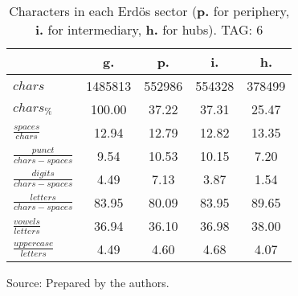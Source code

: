 \begin{table}[h!]
\begin{center}
\caption{Characters in each Erd\"os sector ({{\bf p.}} for periphery, {{\bf i.}} for intermediary, 
	{{\bf h.}} for hubs). TAG: 6}\label{tab:cha}
\begin{tabular}{| l || c | c | c | c |}\hline
 & {\bf g.} & {\bf p.} & {\bf i.} & {\bf h.} \\\hline\hline
$chars$ & 1485813  & 552986  & 554328  & 378499 \\
$chars_{\%}$ & 100.00  & 37.22  & 37.31  & 25.47 \\\hline
$\frac{spaces}{chars}$ & 12.94  & 12.79  & 12.82  & 13.35 \\
$\frac{punct}{chars-spaces}$ & 9.54  & 10.53  & 10.15  & 7.20 \\
$\frac{digits}{chars-spaces}$ & 4.49  & 7.13  & 3.87  & 1.54 \\\hline
$\frac{letters}{chars-spaces}$ & 83.95  & 80.09  & 83.95  & 89.65 \\
$\frac{vowels}{letters}$ & 36.94  & 36.10  & 36.98  & 38.00 \\
$\frac{uppercase}{letters}$ & 4.49  & 4.60  & 4.68  & 4.07 \\\hline
\end{tabular}
\begin{flushleft}
		Source: Prepared by the authors.\
\end{flushleft}
\end{center}
\end{table}
